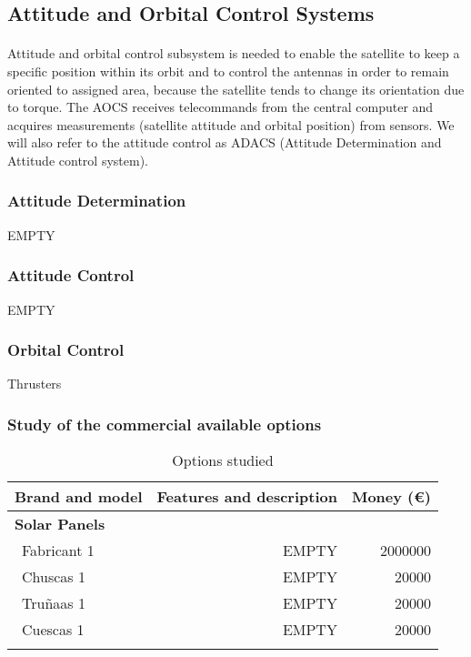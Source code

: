 \subsection{Attitude and Orbital Control Systems}

\paragraph{}Attitude and orbital control subsystem is needed to enable the satellite to keep a specific position within its orbit and to control the antennas in order to remain oriented to assigned area, because the satellite tends to change its orientation due to torque. The AOCS receives telecommands from the central computer and acquires measurements (satellite attitude and orbital position) from sensors. We will also refer to the attitude control as ADACS (Attitude Determination and Attitude control system).


\subsubsection{Attitude Determination}
EMPTY
\subsubsection{Attitude Control}
EMPTY
\subsubsection{Orbital Control}
Thrusters
\subsubsection{Study of the commercial available options}
\begin{longtable}{| l | r | r | }
	\hline
	\rowcolor[gray]{0.80}	\textbf{Brand and model} &  \textbf{Features and description}     & \textbf{Money (\euro)}   \\
	\hline
	\endfirsthead
	
	\rowcolor[gray]{0.85} \textbf{Solar Panels} &  &  \\
	~Fabricant 1 & EMPTY & 2000000 \\
	~Chuscas 1 & EMPTY & 20000 \\
	~Truñaas 1 & EMPTY & 20000 \\
	~Cuescas 1 & EMPTY & 20000 \\
	\hline
	
	\caption{Options studied}
	\label{epsoptionstable}
\end{longtable}